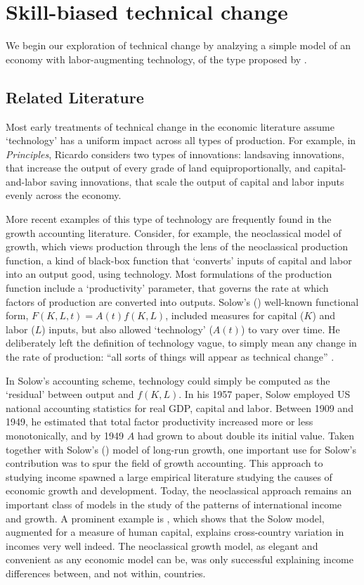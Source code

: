 \chapter{Skill-biased technical change}\label{ch:2}

We begin our exploration of technical change by analzying a simple model of an economy with labor-augmenting technology, of the type proposed by \citet{Griliches1969}.

\section{Related Literature}

Most early treatments of technical change in the economic literature assume `technology' has a uniform impact across all types of production. For example, in {\em Principles}, Ricardo considers two types of innovations: landsaving innovations, that increase the output of every grade of land equiproportionally, and capital-and-labor saving innovations, that scale the output of capital and labor inputs evenly across the economy.

More recent examples of this type of technology are frequently found in the growth accounting literature. Consider, for example, the neoclassical model of growth, which views production through the lens of the neoclassical production function, a kind of black-box function that `converts' inputs of capital and labor into an output good, using technology. Most formulations of the production function include a `productivity' parameter, that governs the rate at which factors of production are converted into outputs. Solow's (\citeyear{Solow1957}) well-known functional form, $F(K,L,t)=A(t)f(K,L)$, included measures for capital ($K$) and labor ($L$) inputs, but also allowed `technology' ($A(t)$) to vary over time. He deliberately left the definition of technology vague, to simply mean any change in the rate of production: ``all sorts of things will appear as technical change'' \citep[p.312]{Solow1957}. 

In Solow's accounting scheme, technology could simply be computed as the `residual' between output and $f(K,L)$. In his 1957 paper, Solow employed US national accounting statistics for real GDP, capital and labor. Between 1909 and 1949, he estimated that total factor productivity increased more or less monotonically, and by 1949 $A$ had grown to about double its initial value. Taken together with Solow's (\citeyear{Solow1956}) model of long-run growth, one important use for Solow's contribution was to spur the field of growth accounting. This approach to studying income spawned a large empirical literature studying the causes of economic growth and development. Today, the neoclassical approach remains an important class of models in the study of the patterns of international income and growth. A prominent example is \citet{Mankiw1992}, which shows that the Solow model, augmented for a measure of human capital, explains cross-country variation in incomes very well indeed. The neoclassical growth model, as elegant and convenient as any economic model can be, was only successful explaining income differences between, and not within, countries.

